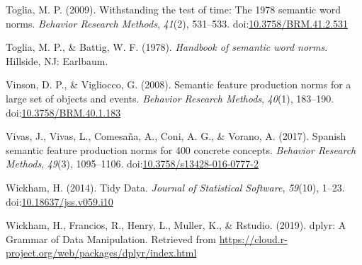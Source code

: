\documentclass[man]{apa6}
\begin{document}
\leavevmode\hypertarget{ref-Toglia2009}{}%
Toglia, M. P. (2009). Withstanding the test of time: The 1978 semantic word norms. \emph{Behavior Research Methods}, \emph{41}(2), 531--533. doi:\href{https://doi.org/10.3758/BRM.41.2.531}{10.3758/BRM.41.2.531}

\leavevmode\hypertarget{ref-Toglia1978}{}%
Toglia, M. P., \& Battig, W. F. (1978). \emph{Handbook of semantic word norms}. Hillside, NJ: Earlbaum.

\leavevmode\hypertarget{ref-Vinson2008}{}%
Vinson, D. P., \& Vigliocco, G. (2008). Semantic feature production norms for a large set of objects and events. \emph{Behavior Research Methods}, \emph{40}(1), 183--190. doi:\href{https://doi.org/10.3758/BRM.40.1.183}{10.3758/BRM.40.1.183}

\leavevmode\hypertarget{ref-Vivas2017}{}%
Vivas, J., Vivas, L., Comesaña, A., Coni, A. G., \& Vorano, A. (2017). Spanish semantic feature production norms for 400 concrete concepts. \emph{Behavior Research Methods}, \emph{49}(3), 1095--1106. doi:\href{https://doi.org/10.3758/s13428-016-0777-2}{10.3758/s13428-016-0777-2}

\leavevmode\hypertarget{ref-Wickham2014}{}%
Wickham, H. (2014). Tidy Data. \emph{Journal of Statistical Software}, \emph{59}(10), 1--23. doi:\href{https://doi.org/10.18637/jss.v059.i10}{10.18637/jss.v059.i10}

\leavevmode\hypertarget{ref-Wickham2019}{}%
Wickham, H., Francios, R., Henry, L., Muller, K., \& Rstudio. (2019). dplyr: A Grammar of Data Manipulation. Retrieved from \url{https://cloud.r-project.org/web/packages/dplyr/index.html}

\endgroup
\end{document}
